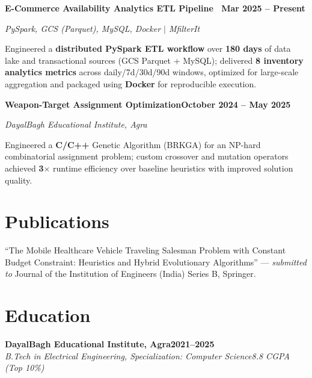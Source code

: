 \documentclass[letterpaper,9pt]{article}
\newcommand{\heading}[2]{
  \hspace{10pt}#1\hfill#2\\
}
\newcommand{\headingBf}[2]{
  \heading{\textbf{#1}}{\textbf{#2}}
}
\newcommand{\headingIt}[2]{
  \heading{\textit{#1}}{\textit{#2}}
}
\newenvironment{resume_list}{
  \vspace{-5pt}
  \begin{itemize}[itemsep=0px, parsep=1pt, leftmargin=30pt]
}{
  \end{itemize}
  \vspace{-4pt}
}
\begin{document}
\vspace{-0.05em}
  \headingBf{E-Commerce Availability Analytics ETL Pipeline ~\normalfont\href{https://github.com/dheeraj-code1/product-availability-etl}{\faGithub}}{Mar 2025 -- Present}
    \vspace{-0.2em}
  \headingIt{PySpark, GCS (Parquet), MySQL, Docker $|$ MfilterIt}{}
  \vspace{-0.1em}
  \begin{resume_list}
    \item Engineered a \textbf{distributed PySpark ETL workflow} over \textbf{180 days} of data lake and transactional sources (GCS Parquet + MySQL); delivered \textbf{8 inventory analytics metrics} across daily/7d/30d/90d windows, optimized for large-scale aggregation and packaged using \textbf{Docker} for reproducible execution.
  \end{resume_list}
\vspace{-0.1em}
  \headingBf{Weapon-Target Assignment Optimization}{October 2024 -- May 2025}
    \vspace{-0.2em}
  \headingIt{DayalBagh Educational Institute, Agra}{}
  \vspace{-0.1em}
  \begin{resume_list}
    \item Engineered a \textbf{C/C++} Genetic Algorithm (BRKGA) for an NP-hard combinatorial assignment problem; custom crossover and mutation operators achieved \textbf{3$\times$} runtime efficiency over baseline heuristics with improved solution quality.
  \end{resume_list}

  \section{Publications}
  \begin{resume_list}
    \item ``The Mobile Healthcare Vehicle Traveling Salesman Problem with Constant Budget Constraint: Heuristics and Hybrid Evolutionary Algorithms'' --- \textit{submitted to} Journal of the Institution of Engineers (India) Series B, Springer.
  \end{resume_list}


\section{Education}
\vspace{-0.5em}
  \headingBf{DayalBagh Educational Institute, Agra}{2021--2025}
  \headingIt{B.Tech in Electrical Engineering, Specialization: Computer Science}{8.8 CGPA (Top 10\%)}
\end{document}
